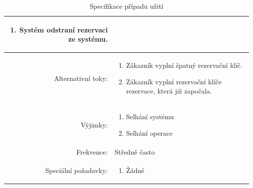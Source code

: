 \documentclass[a4paper,10pt]{article}
\begin{document}
\begin{table}[ht!]
{\begin{tabular}{| r | p{12cm} |}
\begin{minipage}[t]{0.75\textwidth}
\begin{enumerate}[nosep,after=\strut]
            \item Systém odstraní rezervaci ze systému. 
    	\end{enumerate}
  	\end{minipage} \\
    \hline
    Alternativní toky: & 
    \begin{minipage}[t]{0.75\textwidth}
    	\begin{enumerate}[nosep,after=\strut]
            \item Zákazník vyplní špatný rezervační klíč.
            \item Zákazník vyplní rezervační klíče rezervace, která již započala.
    	\end{enumerate}
  	\end{minipage} \\
    \hline
    Výjimky: & 
    \begin{minipage}[t]{0.75\textwidth}
    	\begin{enumerate}[nosep,after=\strut]
    		\item Selhání systému
    		\item Selhání operace
    	\end{enumerate}
  	\end{minipage} \\
    \hline
    Frekvence: & Středně často \\
    \hline
    Speciální požadavky: & 
    \begin{minipage}[t]{0.75\textwidth}
    	\begin{enumerate}[nosep,after=\strut]
    		\item Žádné
    	\end{enumerate}
  	\end{minipage} \\
    \hline

\end{tabular}}
\caption{Specifikace případu užití }
\label{table:1}
\end{table}
\end{document}
